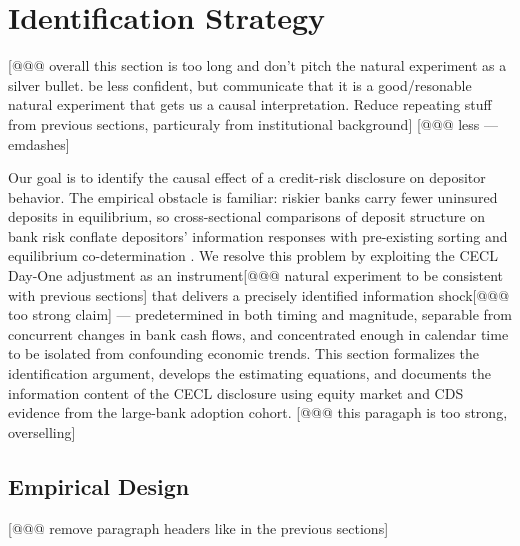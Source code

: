 
\section{Identification Strategy}
[@@@ overall this section is too long and don't pitch the natural experiment as a silver bullet. be less confident, but communicate that it is a good/resonable natural experiment that gets us a causal interpretation. Reduce repeating stuff from previous sections, particuraly from institutional background]
\label{sec:identification}
[@@@ less --- emdashes]

Our goal is to identify the causal effect of a credit-risk disclosure on
depositor behavior.  The empirical obstacle is familiar: riskier banks carry
fewer uninsured deposits in equilibrium, so cross-sectional comparisons of
deposit structure on bank risk conflate depositors' information responses with
pre-existing sorting and equilibrium co-determination
\citep{covitz2004market, chen2022bank}.  We resolve this problem by exploiting
the CECL Day-One adjustment as an instrument[@@@ natural experiment to be consistent with previous sections] that delivers a precisely
identified information shock[@@@ too strong claim] --- predetermined in both timing and magnitude,
separable from concurrent changes in bank cash flows, and concentrated enough
in calendar time to be isolated from confounding economic trends.
This section formalizes the identification argument, develops the estimating
equations, and documents the information content of the CECL disclosure using
equity market and CDS evidence from the large-bank adoption cohort. [@@@ this paragaph is too strong, overselling]

\subsection{Empirical Design}
\label{sec:identification:did}
[@@@ remove paragraph headers like in the previous sections]
